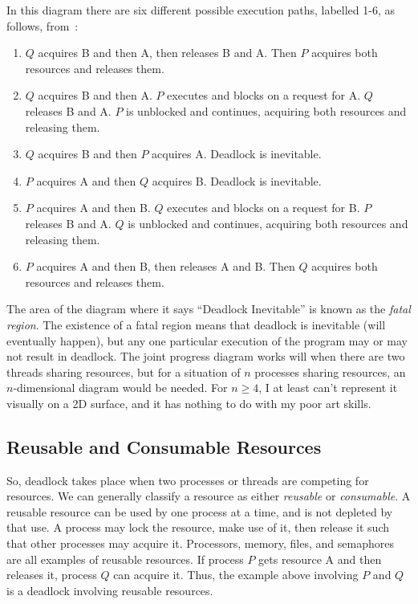 In this diagram there are six different possible execution paths, labelled 1-6, as follows, from~\cite{osi}:
\begin{enumerate}
	\item $Q$ acquires B and then A, then releases B and A. Then $P$ acquires both resources and releases them.
	\item $Q$ acquires B and then A. $P$ executes and blocks on a request for A. $Q$ releases B and A. $P$ is unblocked and continues, acquiring both resources and releasing them.
	\item $Q$ acquires B and then $P$ acquires A. Deadlock is inevitable.
	\item $P$ acquires A and then $Q$ acquires B. Deadlock is inevitable.
	\item $P$ acquires A and then B. $Q$ executes and blocks on a request for B. $P$ releases B and A. $Q$ is unblocked and continues, acquiring both resources and releasing them.
	\item $P$ acquires A and then B, then releases A and B. Then $Q$ acquires both resources and releases them.
\end{enumerate}

The area of the diagram where it says ``Deadlock Inevitable'' is known as the \textit{fatal region}. The existence of a fatal region means that deadlock is inevitable (will eventually happen), but any one particular execution of the program may or may not result in deadlock. The joint progress diagram works will when there are two threads sharing resources, but for a situation of $n$ processes sharing resources, an $n$-dimensional diagram would be needed. For $n \geq 4$, I at least can't represent it visually on a 2D surface, and it has nothing to do with my poor art skills.

\subsection*{Reusable and Consumable Resources}
So, deadlock takes place when two processes or threads are competing for resources. We can generally classify a resource as either \textit{reusable} or \textit{consumable}. A reusable resource can be used by one process at a time, and is not depleted by that use. A process may lock the resource, make use of it, then release it such that other processes may acquire it. Processors, memory, files, and semaphores are all examples of reusable resources. If process $P$ gets resource A and then releases it, process $Q$ can acquire it. Thus, the example above involving $P$ and $Q$ is a deadlock involving reusable resources.

